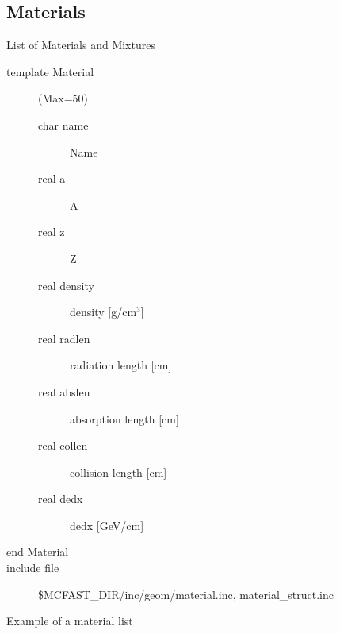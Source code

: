 \subsection{Materials}   List of Materials and Mixtures
\begin{description}
\item[{\rm template} Material](Max=50)
\begin{description}
\item[{\rm  char} name]   Name
\item[{\rm  real} a]      A
\item[{\rm  real} z]      Z
\item[{\rm  real} density]  density  [g/cm$^3$]
\item[{\rm  real} radlen]   radiation length  [cm]
\item[{\rm  real} abslen]   absorption length [cm]
\item[{\rm  real} collen]   collision length  [cm]
\item[{\rm  real} dedx]     dedx [GeV/cm]
\end{description}
\item[end Material]
\item[include file] \$MCFAST\_DIR/inc/geom/material.inc,
material\_struct.inc
\end{description}

Example of a material list\\

